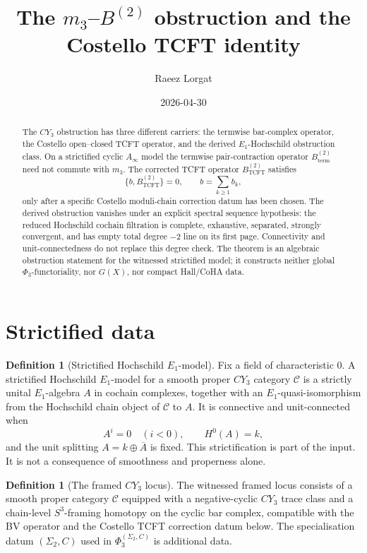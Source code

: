 \documentclass[11pt]{amsart}
\title[\texorpdfstring{$m_3$}{m3} and \texorpdfstring{$B^{(2)}$}{B2}]
{The \texorpdfstring{$m_3$--$B^{(2)}$}{m3-B2} obstruction and the
Costello TCFT identity}
\author{Raeez Lorgat}
\date{2026-04-30}
\providecommand{\Ainf}{A_\infty}
\providecommand{\cC}{\mathcal{C}}
\providecommand{\TCFT}{\mathrm{TCFT}}
\theoremstyle{definition}
\newtheorem{definition}[theorem]{Definition}
\theoremstyle{remark}
\begin{document}
\begin{abstract}
The \(CY_3\) obstruction has three different carriers: the termwise
bar-complex operator, the Costello open--closed TCFT operator, and the
derived \(E_1\)-Hochschild obstruction class.  On a strictified cyclic
\(\Ainf\) model the termwise pair-contraction operator
\(B^{(2)}_{\mathrm{term}}\) need not commute with \(m_3\).  The corrected
TCFT operator \(B^{(2)}_{\TCFT}\) satisfies
\[
        \{b,B^{(2)}_{\TCFT}\}=0,\qquad b=\sum_{k\geq 1} b_k,
\]
only after a specific Costello moduli-chain correction datum has been
chosen.  The derived obstruction vanishes under an explicit spectral
sequence hypothesis: the reduced Hochschild cochain filtration is complete,
exhaustive, separated, strongly convergent, and has empty total degree
\(-2\) line on its first page.  Connectivity and unit-connectedness do not
replace this degree check.  The theorem is an algebraic obstruction
statement for the witnessed strictified model; it constructs neither global
\(\Phi_3\)-functoriality, nor \(G(X)\), nor compact Hall/CoHA data.
\end{abstract}
\maketitle

\section{Strictified data}

\begin{definition}[Strictified Hochschild \(E_1\)-model]
Fix a field of characteristic \(0\).  A strictified Hochschild
\(E_1\)-model for a smooth proper \(CY_3\) category \(\cC\) is a strictly
unital \(E_1\)-algebra \(A\) in cochain complexes, together with an
\(E_1\)-quasi-isomorphism from the Hochschild chain object of \(\cC\) to
\(A\).  It is connective and unit-connected when
\[
        A^i=0\quad(i<0),\qquad H^0(A)=k,
\]
and the unit splitting \(A=k\oplus \overline A\) is fixed.  This
strictification is part of the input.  It is not a consequence of smoothness
and properness alone.
\end{definition}

\begin{definition}[The framed \(CY_3\) locus]
The witnessed framed locus consists of a smooth proper category \(\cC\)
equipped with a negative-cyclic \(CY_3\) trace class and a chain-level
\(S^3\)-framing homotopy on the cyclic bar complex, compatible with the BV
operator and the Costello TCFT correction datum below.
The specialisation datum \((\Sigma_2,C)\) used in
\(\Phi_3^{(\Sigma_2,C)}\) is additional data.
\end{definition}
\end{document}
